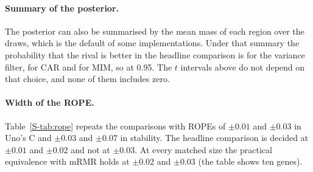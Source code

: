 \begin{table}[htbp]
\centering\footnotesize
\caption{Truncated Uno's C per cohort over ten five-fold splits: mean (standard deviation
over the splits). METABRIC ran on a workstation (Section~\ref{S-sec:software}).}
\label{S-tab:rcvcohort}

\end{table}

\paragraph{Summary of the posterior.} The posterior can also be summarised by the mean
mass of each region over the draws, which is the default of some implementations. Under
that summary the probability that the rival is better in the headline comparison is
\SuppMeanVar{} for the variance filter, \SuppMeanCar{} for CAR and \SuppMeanMim{} for MIM,
so \SuppMeanDecidedText{} at 0.95. The $t$ intervals above do not depend on that choice,
and none of them includes zero.

\paragraph{Width of the ROPE.} Table~\ref{S-tab:rope} repeats the comparisons with ROPEs of
$\pm 0.01$ and $\pm 0.03$ in Uno's C and $\pm 0.03$ and $\pm 0.07$ in stability. The
headline comparison is decided at $\pm 0.01$ and $\pm 0.02$ and not at $\pm 0.03$. At every
matched size the practical equivalence with mRMR holds at $\pm 0.02$ and $\pm 0.03$ (the
table shows ten genes).

\begin{table}[htbp]
\centering\footnotesize
\caption{Verdict of the 0.95 rule by width of the ROPE, on the cohort means over ten
splits:  better, rival better, equivalent (practical equivalence) or
undecided. ``Mean'': the mean-mass summary of the posterior instead of the argmax.}
\label{S-tab:rope}

\end{table}

\begin{table}[htbp]
\centering\footnotesize
\caption{Bayesian signed-rank comparison of  in top-$K$ mode with every other
selector across the TCGA cohorts, on the published split with the untruncated Uno's C.
Each probability is the share of posterior draws in which the region holds the largest
mass, as written by , rounded to two decimals.
Probabilities above 0.95, the decision threshold, are in bold.}
\label{S-tab:bayes}

\end{table}

